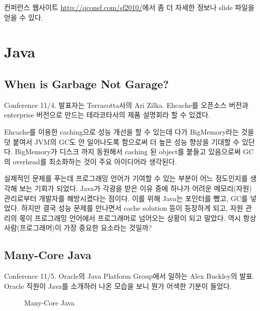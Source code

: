 \documentclass[11pt]{article}
\begin{document}
컨퍼런스 웹사이트 \url{http://qconsf.com/sf2010/}에서 좀 더 자세한 정보나 
slide 파일을 얻을 수 있다.


\section{Java}

\subsection{When is Garbage Not Garage?}

Conference 11/4. 발표자는 Terracotta사의 Ari Zilka.
Ehcache를 오픈소스 버전과 enterprise 버전으로 만드는 테라코타사의 제품 
설명회라 할 수 있겠다.
 
Ehcache를 이용한 caching으로 성능 개선을 할 수 있는데 다가
BigMemory라는 것을 덧 붙여서 JVM의 GC도 안 일어나도록 함으로써 더 높은
성능 향상을 기대할 수 있단다.
BigMemory가 디스크 까지 동원해서 caching 된 object를 붙들고 있음으로써
GC의 overhead를 최소화하는 것이 주요 아이디어라 생각된다.
 
실제적인 문제를 푸는데 프로그래밍 언어가 기여할 수 있는 부분이 어느 
정도인지를 생각해 보는 기회가 되었다.
Java가 각광을 받은 이유 중에 하나가 어려운 메모리(자원) 관리로부터 개발자를 
해방시켰다는 점이다. 이를 위해 Java는 포인터를 뺐고, GC를 넣었다. 
하지만 결국 성능 문제를 만나면서 cache solution 등이 등장하게 되고, 자원 
관리의 몫이 프로그래밍 언어에서 프로그래머로 넘어오는 상황이 되고 말았다.
역시 항상 사람(프로그래머)이 가장 중요한 요소라는 것일까?

\subsection{Many-Core Java}
\label{many core java}

Conference 11/5. Oracle의 Java Platform Group에서 일하는 Alex Buckley의 발표.
Oracle 직원이 Java를 소개하러 나온 모습을 보니 뭔가 어색한 기분이 들었다. 

\begin{figure}[t]
    \begin{Frame}
        \begin{center}
        \end{center}
    \end{Frame}
    \caption{Many-Core Java}
    \label{lambda}
\end{figure}
\end{document}
